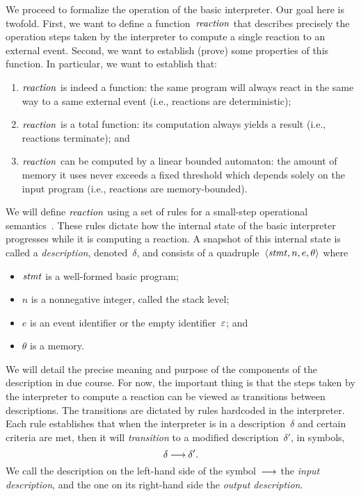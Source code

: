 We proceed to formalize the operation of the basic \CEU interpreter.  Our
goal here is twofold.  First, we want to define a function~$\mathop{\mathit{reaction}}$ that
describes precisely the operation steps taken by the interpreter to compute
a single reaction to an external event.  Second, we want to establish
(prove) some properties of this function.  In particular, we want to
establish that:
\begin{enumerate}
\item $\mathop{\mathit{reaction}}$ is indeed a function: the same program will always react
  in the same way to a same external event (i.e., reactions are
  deterministic);
\item $\mathop{\mathit{reaction}}$ is a total function: its computation always yields a
  result (i.e., reactions terminate); and
\item $\mathop{\mathit{reaction}}$ can be computed by a linear bounded automaton: the amount
  of memory it uses never exceeds a fixed threshold which depends solely on
  the input program (i.e., reactions are memory-bounded).
\end{enumerate}

We will define $\mathop{\mathit{reaction}}$ using a set of rules for a small-step operational
semantics~\cite{Plotkin-G-D-1981}.  These rules dictate how the internal
state of the basic \CEU interpreter progresses while it is computing a
reaction.  A snapshot of this internal state is called a \emph{description},
denoted~$\delta$, and consists of a quadruple~$\<\stmt,n,e,\theta>$ where
\begin{itemize}
\item $\mathit{stmt}$ is a well-formed basic \CEU program;
\item $n$ is a nonnegative integer, called the stack level;
\item $e$ is an event identifier or the empty identifier~$\varepsilon$;
  and
\item $\theta$ is a memory.
\end{itemize}

We will detail the precise meaning and purpose of the components of the
description in due course.  For now, the important thing is that the steps
taken by the interpreter to compute a reaction can be viewed as transitions
between descriptions.  The transitions are dictated by rules hardcoded in
the interpreter.  Each rule establishes that when the interpreter is in a
description~$\delta$ and certain criteria are met, then it will
\emph{transition} to a modified description~$\delta'$, in symbols,
\[
  \delta\trans\delta'.
\]
We call the description on the left-hand side of the symbol~$\trans$ the
\emph{input description}, and the one on its right-hand side the
\emph{output description}.

